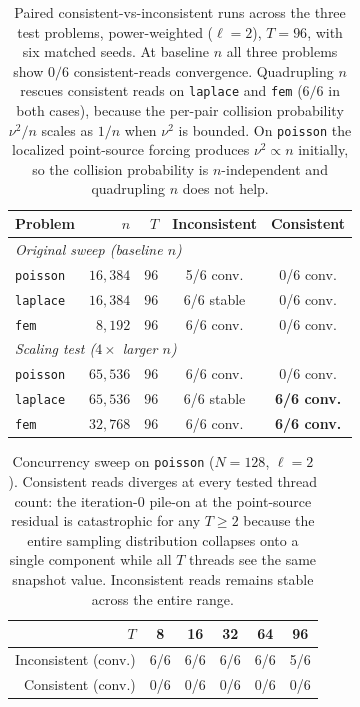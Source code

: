 \documentclass[pdflatex,sn-mathphys-num]{sn-jnl}%
\theoremstyle{thmstyleone}%
\theoremstyle{thmstyletwo}%
\theoremstyle{thmstylethree}%
\begin{document}
\begin{table}[ht]
\centering
\small
\renewcommand{\arraystretch}{1.1}
\begin{tabular}{l r r c c}
\toprule
Problem & $n$ & $T$ & Inconsistent & Consistent \\
\midrule
\multicolumn{5}{l}{\textit{Original sweep (baseline $n$)}}\\
\texttt{poisson} & $16{,}384$  & 96 & 5/6 conv. & 0/6 conv. \\
\texttt{laplace} & $16{,}384$  & 96 & 6/6 stable & 0/6 conv. \\
\texttt{fem}     & $8{,}192$   & 96 & 6/6 conv.  & 0/6 conv. \\
\midrule
\multicolumn{5}{l}{\textit{Scaling test ($4\times$ larger $n$)}}\\
\texttt{poisson} & $65{,}536$  & 96 & 6/6 conv.  & 0/6 conv. \\
\texttt{laplace} & $65{,}536$  & 96 & 6/6 stable & \textbf{6/6 conv.} \\
\texttt{fem}     & $32{,}768$  & 96 & 6/6 conv.  & \textbf{6/6 conv.} \\
\bottomrule
\end{tabular}
\caption{Paired consistent-vs-inconsistent runs across the three test
problems, power-weighted ($\ell=2$), $T=96$, with six matched seeds.
At baseline $n$ all three problems show $0/6$ consistent-reads convergence.
Quadrupling $n$ rescues consistent reads on \texttt{laplace} and
\texttt{fem} ($6/6$ in both cases), because the per-pair collision
probability $\nu^2/n$ scales as $1/n$ when $\nu^2$ is bounded. On
\texttt{poisson} the localized point-source forcing produces
$\nu^2 \propto n$ initially, so the collision probability is
$n$-independent and quadrupling $n$ does not help.}
\label{tab:consistency-sweep}
\end{table}

\begin{table}[ht]
\centering
\small
\renewcommand{\arraystretch}{1.1}
\begin{tabular}{r c c c c c}
\toprule
$T$ & 8 & 16 & 32 & 64 & 96 \\
\midrule
Inconsistent (conv.) & 6/6 & 6/6 & 6/6 & 6/6 & 5/6 \\
Consistent  (conv.)  & 0/6 & 0/6 & 0/6 & 0/6 & 0/6 \\
\bottomrule
\end{tabular}
\caption{Concurrency sweep on \texttt{poisson} ($N=128$, $\ell=2$).
Consistent reads diverges at every tested thread count: the iteration-0
pile-on at the point-source residual is catastrophic for any $T \geq 2$
because the entire sampling distribution collapses onto a single component
while all $T$ threads see the same snapshot value. Inconsistent reads
remains stable across the entire range.}
\label{tab:threshold-sweep}
\end{table}
\end{document}
